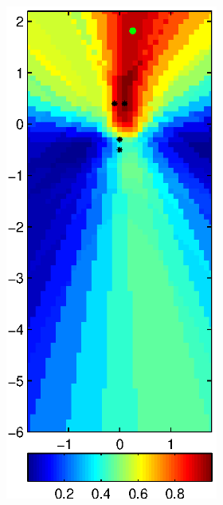 \documentclass[spanish,openright]{book}
\begin{document}
\begin{figure}
\begin{subfigure}[t]{0.47\textwidth}
\begin{minipage}[t]{\textwidth}
\begin{subfigure}[t]{0.3\textwidth}
\includegraphics[width=\textwidth]{Pattern_Fo1500_pos08}

\end{subfigure}
\end{minipage}
\end{subfigure}
\end{figure}
\end{document}
